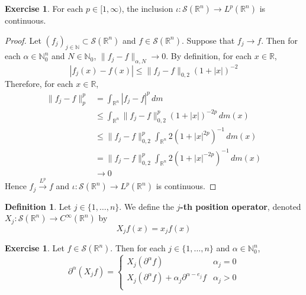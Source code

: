 \documentclass[12pt]{amsart}
\theoremstyle{definition}
\newtheorem{defn}[definition]{Definition}
\newtheorem{ex}[definition]{Exercise}
\newcommand{\p}{\partial}
\newcommand{\al}{\alpha}
\newcommand{\N}{\mathbb{N}}
\newcommand{\R}{\mathbb{R}}
\newcommand{\MS}{\mathcal{S}}
\newcommand{\dm}{\, d m}
\newcommand{\conv}[1]{\xrightarrow{#1}}
\begin{document}
	\begin{ex}
		For each $p \in [1, \infty)$, the inclusion $\iota: \MS(\R^n) \rightarrow L^p(\R^n)$ is continuous. 
	\end{ex}

	\begin{proof}
		Let $(f_j)_{j \in \N} \subset \MS(\R^n)$ and $f \in \MS(\R^n)$. Suppose that $f_j \rightarrow f$. Then for each $\al \in \N_0^n$ and $N \in \N_0$, $\|f_j -f \|_{\al, N} \rightarrow 0$. By definition, for each $x \in \R$, 
		$$|f_j(x) - f(x)| \leq \|f_j - f\|_{0, 2} (1 + |x|)^{-2}$$
		Therefore, for each $x \in \R$, 
		\begin{align*}
			\|f_j - f\|_{p}^p 
			& = \int_{\R^n} |f_j - f|^p \dm \\
			& \leq \int_{\R^n} \|f_j - f\|_{0, 2}^p (1 + |x|)^{-2p} \dm(x) \\
			& \leq \|f_j - f\|_{0, 2}^p \int_{\R^n}  2(1 + |x|^{2p})^{-1} \dm(x) \\
			& = \|f_j - f\|_{0, 2}^p \int_{\R^n}  2(1 + |x|^{-2p})^{-1} \dm(x) \\
			& \rightarrow 0
		\end{align*}
		Hence $f_j \conv{L^p} f$ and $\iota: \MS(\R^n) \rightarrow L^p(\R^n)$ is continuous.
	\end{proof}

	\begin{defn}
		Let $j \in \{1, \ldots, n\}$. We define the \textbf{$j$-th position operator}, denoted $X_j: \MS(\R^n) \rightarrow C^{\infty}(\R^n)$ by 
		$$X_jf(x) = x_j f(x)$$
	\end{defn}

	\begin{ex}
		Let $f \in \MS(\R^n)$. Then for each $j \in \{1, \ldots, n\}$ and $\al \in \N_0^n$, 
		\[
		\p^{\al}(X_jf) = 
		\begin{cases}
			X_j (\p^{\al}f) & \al_j = 0 \\
			X_j (\p^{\al} f) + \al_j \p^{\al - e_j} f & \al_j > 0 \\
		\end{cases}
		\]
	\end{ex}
	
\end{document}
